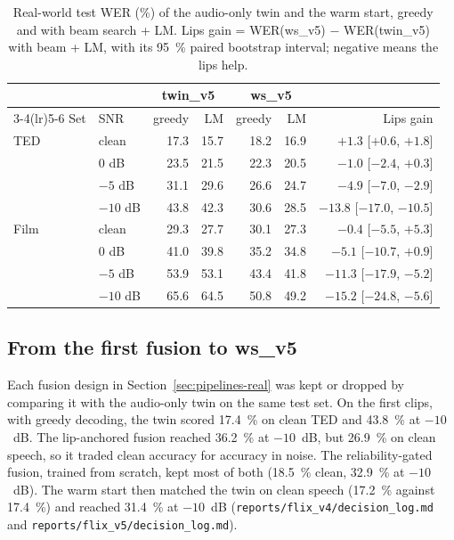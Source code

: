 \begin{table}[t]
\caption{Real-world test WER (\%) of the audio-only twin and the warm start, greedy and with beam
search + LM. Lips gain = WER(ws\_v5) $-$ WER(twin\_v5) with beam + LM, with its 95~\% paired
bootstrap interval; negative means the lips help.}
\label{tab:realworld}
\centering
\setlength{\tabcolsep}{4pt}
\begin{tabular}{llrrrrr}
\toprule
 & & \multicolumn{2}{c}{twin\_v5} & \multicolumn{2}{c}{ws\_v5} & \\
\cmidrule(lr){3-4}\cmidrule(lr){5-6}
Set & SNR & greedy & LM & greedy & LM & Lips gain \\
\midrule
TED  & clean   & 17.3 & 15.7 & 18.2 & 16.9 & $+1.3$ [$+0.6$, $+1.8$] \\
     & 0 dB    & 23.5 & 21.5 & 22.3 & 20.5 & $-1.0$ [$-2.4$, $+0.3$] \\
     & $-5$ dB & 31.1 & 29.6 & 26.6 & 24.7 & $-4.9$ [$-7.0$, $-2.9$] \\
     & $-10$ dB& 43.8 & 42.3 & 30.6 & 28.5 & $-13.8$ [$-17.0$, $-10.5$] \\
\midrule
Film & clean   & 29.3 & 27.7 & 30.1 & 27.3 & $-0.4$ [$-5.5$, $+5.3$] \\
     & 0 dB    & 41.0 & 39.8 & 35.2 & 34.8 & $-5.1$ [$-10.7$, $+0.9$] \\
     & $-5$ dB & 53.9 & 53.1 & 43.4 & 41.8 & $-11.3$ [$-17.9$, $-5.2$] \\
     & $-10$ dB& 65.6 & 64.5 & 50.8 & 49.2 & $-15.2$ [$-24.8$, $-5.6$] \\
\bottomrule
\end{tabular}
\end{table}

\subsection{From the first fusion to ws\_v5}
Each fusion design in Section~\ref{sec:pipelines-real} was kept or dropped by comparing it with
the audio-only twin on the same test set. On the first clips, with greedy decoding, the twin
scored 17.4~\% on clean TED and 43.8~\% at $-10$~dB. The lip-anchored fusion reached 36.2~\% at
$-10$~dB, but 26.9~\% on clean speech, so it traded clean accuracy for accuracy in noise. The
reliability-gated fusion, trained from scratch, kept most of both (18.5~\% clean, 32.9~\% at
$-10$~dB). The warm start then matched the twin on clean speech (17.2~\% against 17.4~\%) and
reached 31.4~\% at $-10$~dB (\texttt{reports/\allowbreak{}flix\_\allowbreak{}v4/\allowbreak{}decision\_\allowbreak{}log.md} and
\texttt{reports/\allowbreak{}flix\_\allowbreak{}v5/\allowbreak{}decision\_\allowbreak{}log.md}).

